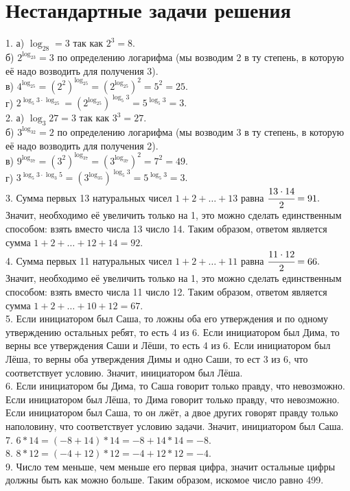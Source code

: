 \section{Нестандартные задачи решения}
1. а) $\log_28=3$ так как $2^3=8.$\\
б) $2^{\log_23}=3$ по определению логарифма (мы возводим 2 в ту степень, в которую её надо возводить для получения 3).\\
в) $4^{\log_25}=(2^2)^{\log_25}=(2^{\log_25})^2=5^2=25.$\\
г) $2^{\log_5 3\cdot\log_25}=(2^{\log_25})^{\log_5 3}=5^{\log_5 3}=3.$\\
2. а) $\log_3 27=3$ так как $3^3=27.$\\
б) $3^{\log_32}=2$ по определению логарифма (мы возводим 3 в ту степень, в которую её надо возводить для получения 2).\\
в) $9^{\log_37}=(3^2)^{\log_37}=(3^{\log_37})^2=7^2=49.$\\
г) $3^{\log_5 3\cdot\log_3 5}=(3^{\log_35})^{\log_5 3}=5^{\log_5 3}=3.$\\
3. Сумма первых 13 натуральных чисел $1+2+\ldots+13$ равна $\cfrac{13\cdot14}{2}=91.$ Значит, необходимо её увеличить только на 1, это можно сделать единственным способом: взять вместо числа 13 число 14. Таким образом, ответом является сумма $1+2+\ldots+12+14=92.$\\
4. Сумма первых 11 натуральных чисел $1+2+\ldots+11$ равна $\cfrac{11\cdot12}{2}=66.$ Значит, необходимо её увеличить только на 1, это можно сделать единственным способом: взять вместо числа 11 число 12. Таким образом, ответом является сумма $1+2+\ldots+10+12=67.$\\
5. Если инициатором был Саша, то ложны оба его утверждения и по одному утверждению остальных ребят, то есть 4 из 6. Если инициатором был Дима, то верны все утверждения Саши и Лёши, то есть 4 из 6. Если инициатором был Лёша, то верны оба утверждения Димы и одно Саши, то ест 3 из 6, что соответствует условию. Значит, инициатором был Лёша.\\
6. Если инициатором бы Дима, то Саша говорит только правду, что невозможно. Если инициатором был Лёша, то  Дима говорит только правду, что невозможно. Если инициатором был Саша, то он лжёт, а двое других говорят правду только наполовину, что соответствует условию задачи. Значит, инициатором был Саша.\\
7. $6*14=(-8+14)*14=-8+14*14=-8.$\\
8. $8*12=(-4+12)*12=-4+12*12=-4.$\\
9. Число тем меньше, чем меньше его первая цифра, значит остальные цифры должны быть как можно больше. Таким образом, искомое число равно 499.\\
